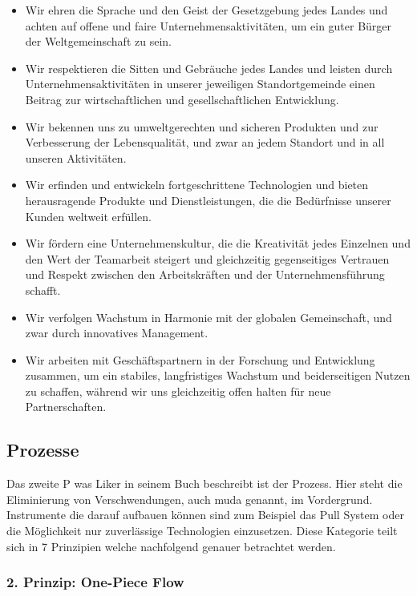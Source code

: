 \documentclass[a4paper,12pt]{scrartcl}
\begin{document}
\begin{itemize}
    \item Wir ehren die Sprache und den Geist der Gesetzgebung jedes Landes und achten auf offene und faire Unternehmensaktivitäten, um ein guter Bürger der Weltgemeinschaft zu sein.
    \item Wir respektieren die Sitten und Gebräuche jedes Landes und leisten durch Unternehmensaktivitäten in unserer jeweiligen Standortgemeinde einen Beitrag zur wirtschaftlichen und gesellschaftlichen Entwicklung.
    \item Wir bekennen uns zu umweltgerechten und sicheren Produkten und zur Verbesserung der Lebensqualität, und zwar an jedem Standort und in all unseren Aktivitäten.
    \item Wir erfinden und entwickeln fortgeschrittene Technologien und bieten herausragende Produkte und Dienstleistungen, die die Bedürfnisse unserer Kunden weltweit erfüllen.
    \item Wir fördern eine Unternehmenskultur, die die Kreativität jedes Einzelnen und den Wert der Teamarbeit steigert und gleichzeitig gegenseitiges Vertrauen und Respekt zwischen den Arbeitskräften und der Unternehmensführung schafft.
    \item Wir verfolgen Wachstum in Harmonie mit der globalen Gemeinschaft, und zwar durch innovatives Management.
    \item Wir arbeiten mit Geschäftspartnern in der Forschung und Entwicklung zusammen, um ein stabiles, langfristiges Wachstum und beiderseitigen Nutzen zu schaffen, während wir uns gleichzeitig offen halten für neue Partnerschaften.
\end{itemize}



\subsection{Prozesse}

Das zweite P was Liker in seinem Buch beschreibt ist der Prozess. Hier steht die Eliminierung von Verschwendungen, auch muda genannt, im Vordergrund. Instrumente die darauf aufbauen können sind zum Beispiel das Pull System oder die Möglichkeit nur zuverlässige Technologien einzusetzen. Diese Kategorie teilt sich in 7 Prinzipien welche nachfolgend genauer betrachtet werden. 

\subsubsection{2. Prinzip: One-Piece Flow}
\end{document}

